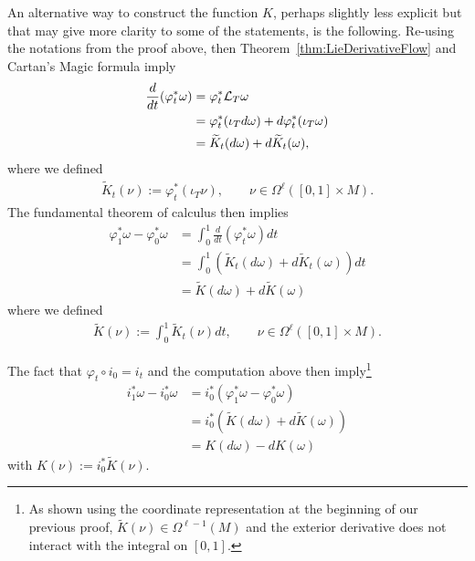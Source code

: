 \begin{remark}
	An alternative way to construct the function $K$, perhaps slightly less explicit but that may give more clarity to some of the statements, is the following. Re-using the notations from the proof above, then Theorem~\ref{thm:LieDerivativeFlow} and Cartan's Magic formula imply
	\begin{align}
		\frac{d}{dt} (\varphi_t^*\omega) & = \varphi^*_t \mathcal{L}_T \omega                                        \\
		                                 & = \varphi_t^* ( \iota_T d\omega) + d \varphi_t^* (\iota_T \omega) \\
		                                 & = \widetilde K_t (d\omega) + d \widetilde K_t (\omega),
	\end{align}
	where we defined
	\begin{align}
		\widetilde K_t(\nu) := \varphi_t^* (\iota_T \nu),
		\qquad \nu \in \Omega^\ell([0,1]\times M).
	\end{align}
	The fundamental theorem of calculus then implies
	\begin{align}
		\varphi_1^* \omega - \varphi_0^* \omega & = \int_0^1 \frac{d}{dt} (\varphi_t^*\omega) dt                                 \\
		                                        & = \int_0^1 \left(\widetilde K_t (d\omega) + d \widetilde K_t(\omega)\right) dt \\
		                                        & = \widetilde K (d\omega) + d \widetilde K (\omega)
	\end{align}
	where we defined
	\begin{align}
		\widetilde K(\nu) := \int_0^1 \widetilde K_t (\nu) dt,
		\qquad \nu \in \Omega^\ell([0,1]\times M).
	\end{align}

	The fact that $\varphi_t \circ i_0 = i_t$ and the computation above then imply\footnote{As shown using the coordinate representation at the beginning of our previous proof, $\widetilde K(\nu) \in \Omega^{\ell-1}(M)$ and the exterior derivative does not interact with the integral on $[0,1]$.}
	\begin{align}
		i_1^* \omega - i_0^* \omega & = i_0^* (\varphi_1^* \omega - \varphi_0^* \omega)                     \\
		                            & = i_0^* \left(\widetilde K (d\omega) + d \widetilde K (\omega)\right) \\
		                            & = K(d \omega) - d K(\omega)
	\end{align}
	with $K(\nu) := i_0^* \widetilde K(\nu)$.
\end{remark}

